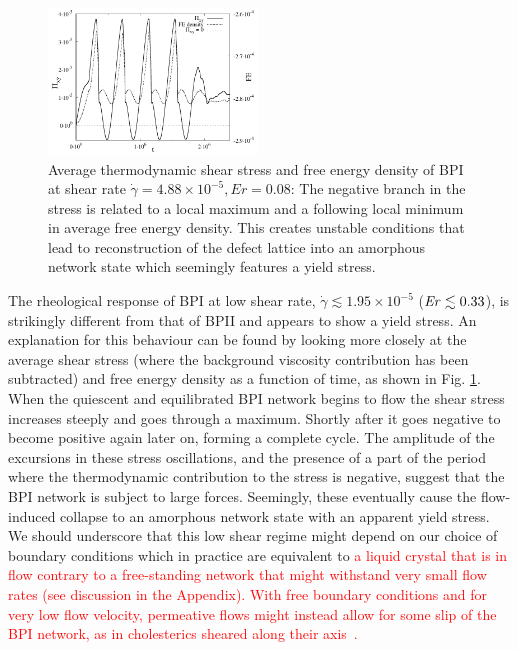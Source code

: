 \documentclass[8.5pt,twoside,twocolumn]{article}
\newcommand{\e}[1]{\times10^{#1}}
\newcommand{\gd}{\dot{\gamma}}
\newcommand{\rev}[1]{{\textcolor{red}{#1}}}
\begin{document}
\begin{figure}[htpb]
\includegraphics[width=0.495\textwidth]{stress_fe_yield_bp1.pdf}
\caption{Average thermodynamic shear stress and free energy density of 
BPI at shear rate $\gd=4.88\e{-5}, Er=0.08$: 
The negative branch in the stress is related to a local maximum 
and a following local minimum in average free energy density. 
This creates unstable conditions that lead to reconstruction of the 
defect lattice into an amorphous network state which 
seemingly features a yield stress.}
\label{bp1-fe-yield}
\end{figure}

The rheological response of BPI at low shear rate, $\gd\lesssim1.95\e{-5}$
(${\it Er} \lesssim 0.33$), 
is strikingly different from that of BPII and appears to show a
yield stress. An explanation for this behaviour can be found by 
looking more closely at the average shear stress (where the
background viscosity contribution has been subtracted) and 
free energy density as a function of time, as shown in Fig. \ref{bp1-fe-yield}.
When the quiescent and equilibrated BPI network begins to flow
the shear stress increases steeply and goes through a maximum.
Shortly after it goes negative 
to become positive again later on, forming a complete cycle.
The amplitude of the excursions in these stress oscillations, and
the presence of a part of the period where the thermodynamic
contribution to the stress is negative, suggest that the
BPI network is subject to large forces. Seemingly, these eventually
cause the flow-induced collapse to an amorphous network state with
an apparent yield stress. We should underscore that this
low shear regime might depend on our choice of boundary
conditions which in practice are equivalent to 
\rev{
a liquid crystal that is in flow
contrary to a free-standing network that might withstand
very small flow rates (see discussion in the Appendix).
With free boundary conditions and for very low flow velocity, 
permeative flows might instead allow for
some slip of the BPI network, as in cholesterics sheared
along their axis~\cite{Marenduzzo:2006b}.
}
\end{document}
